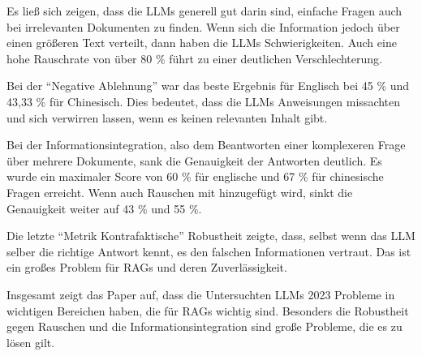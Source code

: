 Es ließ sich zeigen, dass die LLMs generell gut darin sind, einfache Fragen auch bei irrelevanten Dokumenten zu finden.
Wenn sich die Information jedoch über einen größeren Text verteilt, dann haben die LLMs Schwierigkeiten.
Auch eine hohe Rauschrate von über 80 \% führt zu einer deutlichen Verschlechterung.

Bei der \enquote{Negative Ablehnung} war das beste Ergebnis für Englisch bei 45 \% und 43,33 \% für Chinesisch. Dies bedeutet, dass die LLMs Anweisungen missachten und sich verwirren lassen, wenn es keinen relevanten Inhalt gibt.

Bei der Informationsintegration, also dem Beantworten einer komplexeren Frage über mehrere Dokumente, sank die Genauigkeit der Antworten deutlich.
Es wurde ein maximaler Score von 60 \% für englische und 67 \% für chinesische Fragen erreicht. Wenn auch Rauschen mit hinzugefügt wird, sinkt die Genauigkeit weiter auf 43 \% und 55 \%.

Die letzte \enquote{Metrik Kontrafaktische} Robustheit zeigte, dass, selbst wenn das LLM selber die richtige Antwort kennt, es den falschen Informationen vertraut. Das ist ein großes Problem für RAGs und deren Zuverlässigkeit.

Insgesamt zeigt das Paper auf, dass die Untersuchten LLMs 2023 Probleme in wichtigen Bereichen haben, die für RAGs wichtig sind.
Besonders die Robustheit gegen Rauschen und die Informationsintegration sind große Probleme, die es zu lösen gilt.